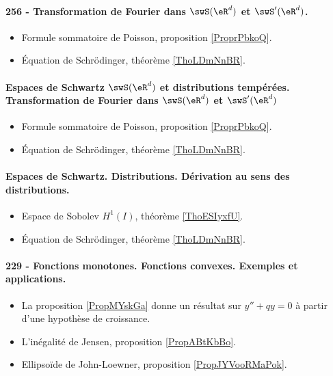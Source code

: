 \paragraph{256 - Transformation de Fourier dans \( \swS(\eR^d)\) et \( \swS'(\eR^d)\).}
\begin{itemize}
    \item Formule sommatoire de Poisson, proposition \ref{ProprPbkoQ}.
    \item Équation de Schrödinger, théorème \ref{ThoLDmNnBR}.
\end{itemize}
\paragraph{Espaces de Schwartz \( \swS(\eR^d)\) et distributions tempérées. Transformation de Fourier dans \( \swS(\eR^d)\) et \( \swS'(\eR^d)\)}
\begin{itemize}
    \item Formule sommatoire de Poisson, proposition \ref{ProprPbkoQ}.
    \item Équation de Schrödinger, théorème \ref{ThoLDmNnBR}.
\end{itemize}
\paragraph{Espaces de Schwartz. Distributions. Dérivation au sens des distributions.}
\begin{itemize}
    \item Espace de Sobolev \( H^1(I)\), théorème \ref{ThoESIyxfU}.
    \item Équation de Schrödinger, théorème \ref{ThoLDmNnBR}.
\end{itemize}

\paragraph{229 - Fonctions monotones. Fonctions convexes. Exemples et applications.}
\begin{itemize}
    \item La proposition \ref{PropMYskGa} donne un résultat sur \( y''+qy=0\) à partir d'une hypothèse de croissance.
    \item L'inégalité de Jensen, proposition \ref{PropABtKbBo}.
    \item Ellipsoïde de John-Loewner, proposition \ref{PropJYVooRMaPok}.
\end{itemize}

